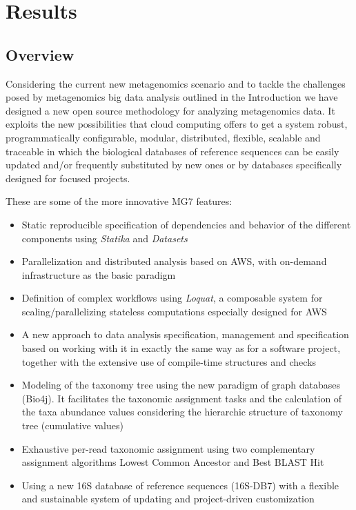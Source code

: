 \documentclass[fontsize=8pt,paper=a4,pagesize,abstracton]{scrartcl}
\providecommand{\tightlist}{%
\setlength{\itemsep}{0pt}\setlength{\parskip}{0pt}}
\begin{document}
\section{Results}\label{results}

\subsection{Overview}\label{overview}

Considering the current new metagenomics scenario and to tackle the
challenges posed by metagenomics big data analysis outlined in the
Introduction we have designed a new open source methodology for
analyzing metagenomics data. It exploits the new possibilities that
cloud computing offers to get a system robust, programmatically
configurable, modular, distributed, flexible, scalable and traceable in
which the biological databases of reference sequences can be easily
updated and/or frequently substituted by new ones or by databases
specifically designed for focused projects.

These are some of the more innovative MG7 features:

\begin{itemize}
\tightlist
\item
  Static reproducible specification of dependencies and behavior of the
  different components using \emph{Statika} and \emph{Datasets}
\item
  Parallelization and distributed analysis based on AWS, with on-demand
  infrastructure as the basic paradigm
\item
  Definition of complex workflows using \emph{Loquat}, a composable
  system for scaling/parallelizing stateless computations especially
  designed for AWS
\item
  A new approach to data analysis specification, management and
  specification based on working with it in exactly the same way as for
  a software project, together with the extensive use of compile-time
  structures and checks
\item
  Modeling of the taxonomy tree using the new paradigm of graph
  databases (Bio4j). It facilitates the taxonomic assignment tasks and
  the calculation of the taxa abundance values considering the
  hierarchic structure of taxonomy tree (cumulative values)
\item
  Exhaustive per-read taxonomic assignment using two complementary
  assignment algorithms Lowest Common Ancestor and Best BLAST Hit
\item
  Using a new 16S database of reference sequences (16S-DB7) with a
  flexible and sustainable system of updating and project-driven
  customization
\end{itemize}
\end{document}
